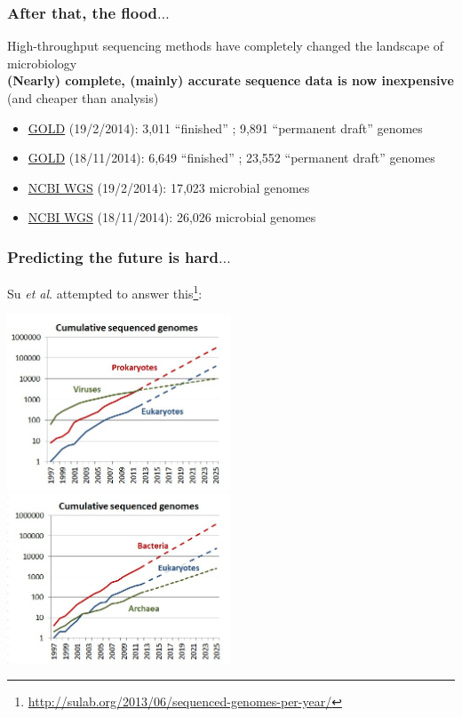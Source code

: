 \begin{frame}
  \frametitle{After that, the flood$\ldots$}
  High-throughput sequencing methods have completely changed the landscape of microbiology \\
  \textbf{(Nearly) complete, (mainly) accurate sequence data is now inexpensive} (and cheaper than analysis)
  \begin{itemize}
    \item \href{http://www.genomesonline.org/cgi-bin/GOLD/index.cgi?page_requested=Complete+Genome+Projects&subset_requested=Complete+And+Published}{GOLD} (19/2/2014): 3,011 ``finished'' ; 9,891 ``permanent draft'' genomes
    \item \href{http://www.genomesonline.org/cgi-bin/GOLD/index.cgi?page_requested=Complete+Genome+Projects&subset_requested=Complete+And+Published}{GOLD} (18/11/2014): 6,649 ``finished'' ; 23,552 ``permanent draft'' genomes    
    \item \href{http://www.ncbi.nlm.nih.gov/Traces/wgs/}{NCBI WGS} (19/2/2014): 17,023 microbial genomes
    \item \href{http://www.ncbi.nlm.nih.gov/Traces/wgs/}{NCBI WGS} (18/11/2014): 26,026 microbial genomes
  \end{itemize}
\end{frame}

\begin{frame}
  \frametitle{Predicting the future is hard$\ldots$}
    Su \textit{et al}. attempted to answer this\footnote{\tiny{\href{http://sulab.org/2013/06/sequenced-genomes-per-year/}{http://sulab.org/2013/06/sequenced-genomes-per-year/}}}:
    \begin{center}
      \includegraphics[width=0.5\textwidth]{images/cumulative_sequenced_genomes1}
      \includegraphics[width=0.5\textwidth]{images/cumulative_sequenced_genomes2}
    \end{center}     
\end{frame}

